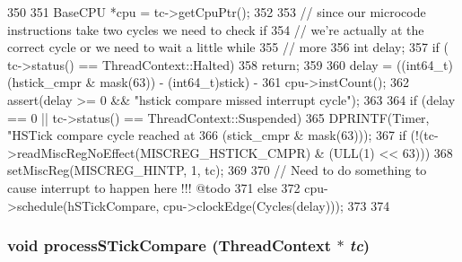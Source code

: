 \begin{DoxyCode}
350 {
351     BaseCPU *cpu = tc->getCpuPtr();
352 
353     // since our microcode instructions take two cycles we need to check if
354     // we're actually at the correct cycle or we need to wait a little while
355     // more
356     int delay;
357     if ( tc->status() == ThreadContext::Halted)
358        return;
359 
360     delay = ((int64_t)(hstick_cmpr & mask(63)) - (int64_t)stick) -
361         cpu->instCount();
362     assert(delay >= 0 && "hstick compare missed interrupt cycle");
363 
364     if (delay == 0 || tc->status() == ThreadContext::Suspended) {
365         DPRINTF(Timer, "HSTick compare cycle reached at %
366                 (stick_cmpr & mask(63)));
367         if (!(tc->readMiscRegNoEffect(MISCREG_HSTICK_CMPR) & (ULL(1) << 63))) {
368             setMiscReg(MISCREG_HINTP, 1, tc);
369         }
370         // Need to do something to cause interrupt to happen here !!! @todo
371     } else {
372         cpu->schedule(hSTickCompare, cpu->clockEdge(Cycles(delay)));
373     }
374 }
\end{DoxyCode}
\hypertarget{classSparcISA_1_1ISA_a69feece7c04b8dc0567ec5050e809913}{
\subsubsection[{processSTickCompare}]{\setlength{\rightskip}{0pt plus 5cm}void processSTickCompare ({\bf ThreadContext} $\ast$ {\em tc})}}
\label{classSparcISA_1_1ISA_a69feece7c04b8dc0567ec5050e809913}



